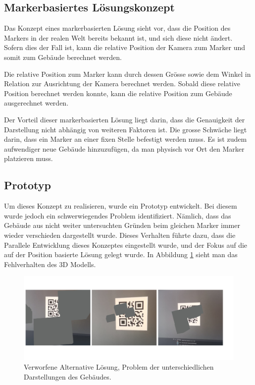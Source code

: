 \documentclass[a4paper]{scrreprt}
\begin{document}
\subsection{Markerbasiertes Lösungskonzept}
\label{ch:markerbasiertesLoesungskonzept}
Das Konzept eines markerbasierten Lösung sieht vor, dass die Position des Markers in der realen Welt bereits bekannt ist, und sich diese nicht ändert. Sofern dies der Fall ist, kann die relative Position der Kamera zum Marker und somit zum Gebäude berechnet werden.

Die relative Position zum Marker kann durch dessen Grösse sowie dem Winkel in Relation zur Ausrichtung der Kamera berechnet werden. Sobald diese relative Position berechnet werden konnte, kann die relative Position zum Gebäude ausgerechnet werden.

Der Vorteil dieser markerbasierten Lösung liegt darin, dass die Genauigkeit der Darstellung nicht abhängig von weiteren Faktoren ist. Die grosse Schwäche liegt darin, dass ein Marker an einer fixen Stelle befestigt werden muss. Es ist zudem aufwendiger neue Gebäude hinzuzufügen, da man physisch vor Ort den Marker platzieren muss.

\subsection{Prototyp}
Um dieses Konzept zu realisieren, wurde ein Prototyp entwickelt. Bei diesem wurde jedoch ein schwerwiegendes Problem identifiziert. Nämlich, dass das Gebäude aus nicht weiter untersuchten Gründen beim gleichen Marker immer wieder verschieden dargestellt wurde. Dieses Verhalten führte dazu, dass die Parallele Entwicklung dieses Konzeptes eingestellt wurde, und der Fokus auf die auf der Position basierte Lösung gelegt wurde. In Abbildung \ref{fig:alternativeSolution} sieht man das Fehlverhalten des 3D Modells.

\begin{figure}[h!]
	\includegraphics[keepaspectratio, width=\textwidth]{alternativeLoesung.png}
	\caption{Verworfene Alternative Lösung, Problem der unterschiedlichen Darstellungen des Gebäudes.}
    \label{fig:alternativeSolution}
\end{figure}
\end{document}
